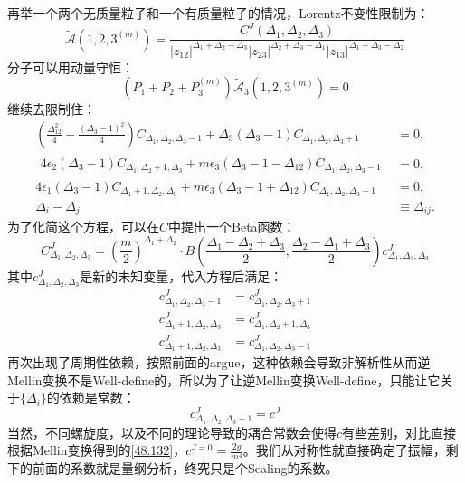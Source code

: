 再举一个两个无质量粒子和一个有质量粒子的情况，Lorentz不变性限制为：
\begin{equation}
	\widetilde{\mathcal{A}}(1,2,3^{(m)})=\frac{C^J(\Delta_1,\Delta_2,\Delta_3)}{|z_{12}|^{\Delta_1+\Delta_2-\Delta_3}|z_{23}|^{\Delta_2+\Delta_3-\Delta_1}|z_{13}|^{\Delta_1+\Delta_3-\Delta_2}}
\end{equation}
分子可以用动量守恒：
\begin{equation}
	\left(P_1+P_2+P_3^{(m)}\right)\widetilde{\mathcal{A}}_3(1,2,3^{(m)})=0
\end{equation}
继续去限制住：
\begin{equation}
	\begin{aligned}
		\left(\frac{\Delta_{12}^2}4-\frac{(\Delta_3-1)^2}4\right)C_{\Delta_1,\Delta_2,\Delta_3-1}+\Delta_3(\Delta_3-1)C_{\Delta_1,\Delta_2,\Delta_3+1}& =0,  \\
		\begin{aligned}4\epsilon_2(\Delta_3-1)C_{\Delta_1,\Delta_2+1,\Delta_3}+m\epsilon_3(\Delta_3-1-\Delta_{12})C_{\Delta_1,\Delta_2,\Delta_3-1}\end{aligned}& =0,  \\
		4\epsilon_1(\Delta_3-1)C_{\Delta_1+1,\Delta_2,\Delta_3}+m\epsilon_3(\Delta_3-1+\Delta_{12})C_{\Delta_1,\Delta_2,\Delta_3-1}& =0, \\
		\Delta_i-\Delta_j&\equiv \Delta_{ij}.
	\end{aligned}
\end{equation}
为了化简这个方程，可以在$C$中提出一个Beta函数：
\begin{equation}
	C_{\Delta_1,\Delta_2,\Delta_3}^J=\left(\frac m2\right)^{\Delta_1+\Delta_2}\cdot B\left(\frac{\Delta_1-\Delta_2+\Delta_3}2,\frac{\Delta_2-\Delta_1+\Delta_3}2\right)c^J_{\Delta_1,\Delta_2,\Delta_3}
\end{equation}
其中$c^J_{\Delta_1,\Delta_2,\Delta_3}$是新的未知变量，代入方程后满足：
\begin{equation}
	\begin{aligned}c^J_{\Delta_1,\Delta_2,\Delta_3-1}&=c^J_{\Delta_1,\Delta_2,\Delta_3+1}\\c^J_{\Delta_1+1,\Delta_2,\Delta_3}&=c^J_{\Delta_1,\Delta_2+1,\Delta_3}\\c^J_{\Delta_1+1,\Delta_2,\Delta_3}&=c^J_{\Delta_1,\Delta_2,\Delta_3-1}\end{aligned}
\end{equation}
再次出现了周期性依赖，按照前面的argue，这种依赖会导致非解析性从而逆Mellin变换不是Well-define的，所以为了让逆Mellin变换Well-define，只能让它关于$\{\Delta_i\}$的依赖是常数：
\begin{equation}
	c^J_{\Delta_1,\Delta_2,\Delta_3-1}=c^J
\end{equation}
当然，不同螺旋度，以及不同的理论导致的耦合常数会使得$c$有些差别，对比直接根据Mellin变换得到的\ref{48.132}，$c^{J=0}=\frac{2g}{m^4}$。我们从对称性就直接确定了振幅，剩下的前面的系数就是量纲分析，终究只是个Scaling的系数。
